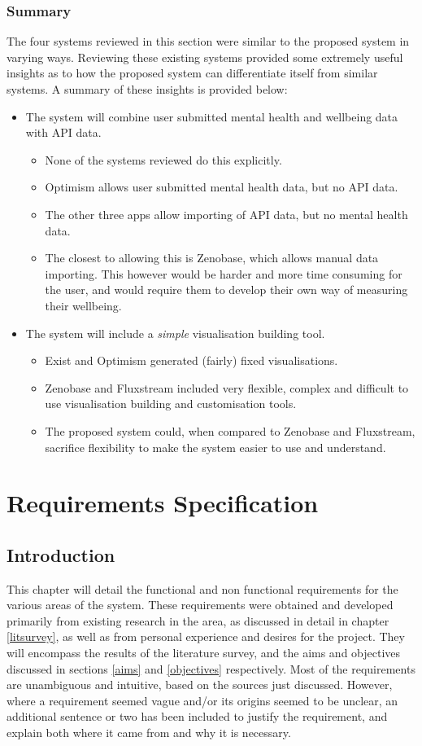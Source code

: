 \documentclass[11pt,openright,a4paper]{report}
\begin{document}
\subsection{Summary}
The four systems reviewed in this section were similar to the proposed system in varying ways. Reviewing these existing systems provided some extremely useful insights as to how the proposed system can differentiate itself from similar systems. A summary of these insights is provided below:
\begin{itemize}
\item The system will combine user submitted mental health and wellbeing data with API data.
  \begin{itemize}
  \item None of the systems reviewed do this explicitly.
  \item Optimism allows user submitted mental health data, but no API data.
  \item The other three apps allow importing of API data, but no mental health data.
  \item The closest to allowing this is Zenobase, which allows manual data importing. This however would be harder and more time consuming for the user, and would require them to develop their own way of measuring their wellbeing.
  \end{itemize}
\item The system will include a \emph{simple} visualisation building tool.
  \begin{itemize}
  \item Exist and Optimism generated (fairly) fixed visualisations.
  \item Zenobase and Fluxstream included very flexible, complex and difficult to use visualisation building and customisation tools.
  \item The proposed system could, when compared to Zenobase and Fluxstream, sacrifice flexibility to make the system easier to use and understand.
  \end{itemize}
\end{itemize}

\chapter{Requirements Specification}
\section{Introduction}
This chapter will detail the functional and non functional requirements for the various areas of the system. These requirements were obtained and developed primarily from existing research in the area, as discussed in detail in chapter \ref{litsurvey}, as well as from personal experience and desires for the project. They will encompass the results of the literature survey, and the aims and objectives discussed in sections \ref{aims} and \ref{objectives} respectively. Most of the requirements are unambiguous and intuitive, based on the sources just discussed. However, where a requirement seemed vague and/or its origins seemed to be unclear, an additional sentence or two has been included to justify the requirement, and explain both where it came from and why it is necessary.
\end{document}
